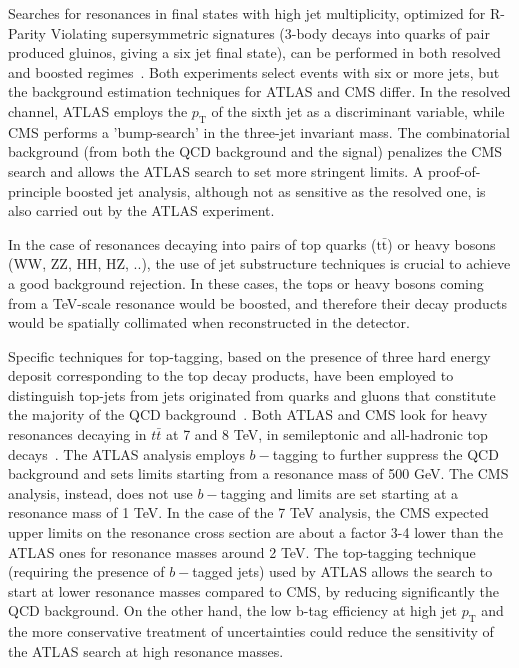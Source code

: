 \documentclass{PoS}
\begin{document}

Searches for resonances in final states with high jet multiplicity, optimized for R-Parity Violating supersymmetric 
signatures (3-body decays into quarks of pair produced gluinos, giving a six jet final state), 
can be performed in both resolved and boosted regimes~\cite{Chatrchyan2012329,SUSYRPVATLAS}.
Both experiments select events with six or more jets, but the background estimation techniques 
for ATLAS and CMS differ. In the resolved channel, ATLAS employs the $p_\mathrm{T}$
of the sixth jet as a discriminant variable, while CMS performs a 'bump-search' in the 
three-jet invariant mass. The combinatorial background (from both the QCD background and the signal)
penalizes the CMS search and allows the ATLAS search to set more stringent limits. A proof-of-principle
boosted jet analysis, although not as sensitive as the resolved one, is also carried out by the ATLAS experiment. 
 
In the case of resonances decaying into pairs of top quarks ($\mbox{t}\bar{\mbox{t}}$) or heavy bosons (WW, ZZ, HH, HZ, ..), 
the use of jet substructure techniques is crucial to achieve a good background rejection. 
In these cases, the tops or heavy bosons coming from a TeV-scale resonance 
would be boosted, and therefore their decay products would be spatially collimated when reconstructed in the detector.  

Specific techniques for top-tagging, based on the presence of three hard energy deposit corresponding
to the top decay products, have been employed to distinguish top-jets from jets originated from quarks and gluons
that constitute the majority of the QCD background~\cite{Kaplan:2008ie, Plehn:2010st, ATLAS-CONF-2012-065, Almeida:2010pa}. 
Both ATLAS and CMS look for heavy resonances decaying in $t\bar{t}$ at 7 and 8 TeV, in semileptonic and all-hadronic top decays~\cite{TtbarResCMS, TtbarResATLAS, CMS-PAS-B2G-12-005, ATLAS-CONF-2013-052, CMS-PAS-B2G-12-006}.
The ATLAS analysis employs $b-$tagging to further suppress the QCD background and sets limits starting from a resonance mass of 500 GeV. 
The CMS analysis, instead, does not use $b-$tagging and limits are set starting at a resonance mass of 1 TeV. 
In the case of the 7 TeV analysis, the CMS expected upper limits on the resonance cross section are 
about a factor 3-4 lower than the ATLAS ones 
for resonance masses around 2 TeV.  The top-tagging technique (requiring the presence of $b-$tagged jets) used
by ATLAS allows the search to start at lower resonance masses 
compared to CMS, by reducing significantly the QCD background.
On the other hand, the low b-tag efficiency at high jet $ p_\mathrm{T}$ and the more conservative
treatment of uncertainties could reduce the sensitivity of the ATLAS search at high resonance masses.
\end{document}
